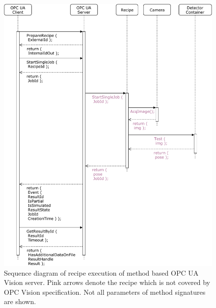 \begin{figure}
    \centering
    \includegraphics[height=0.9\textheight]{img/ConceptRuntimeView-RecipeExecution.pdf}
    \caption[Sequence diagram of recipe execution]{Sequence diagram of recipe execution of method based OPC UA Vision server. Pink arrows denote the recipe which is not covered by OPC Vision specification. Not all parameters of method signatures are shown.}
    \label{fig:runtimeviewexec}
\end{figure}

